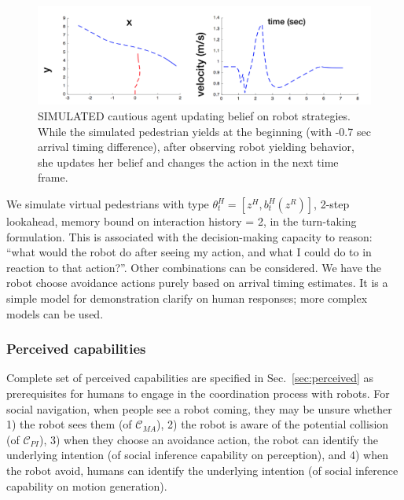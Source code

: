 \documentclass[letterpaper, 10 pt, conference]{ieeeconf}  %
\begin{document}
   \begin{figure}[t]
      \centering
      \hspace{-5em}
      \vspace{-1.3em}
      \includegraphics[scale=0.33]{adaptation}
      \hspace{-5em}
      \caption{SIMULATED cautious agent updating belief on robot strategies. While the simulated pedestrian yields at the 
      beginning (with -0.7 sec arrival timing difference), after observing 
      robot yielding behavior, she updates her 
      belief and changes the action in the next time frame.}
      \vspace{-2em}
     \label{fig:adaptation}
   \end{figure}
We simulate virtual pedestrians with type $\theta^H_t = [z^H, b^H_t(z^R)]$, 2-step 
lookahead, memory bound on interaction history = 2,  
in the turn-taking formulation. This is associated with the decision-making 
capacity to reason: ``what would the robot do after seeing my action, and what 
I could do to in reaction to that action?''. Other combinations can be 
considered. 
We have the robot 
choose avoidance actions purely based on arrival timing estimates. It is a  simple model for demonstration clarify on human 
responses; more complex models can be used.

\subsubsection{Perceived capabilities}
Complete set of perceived capabilities are specified in Sec.~\ref{sec:perceived} as 
prerequisites for humans to engage in the coordination process with robots. 
For social navigation, when people see a robot coming, they may be unsure 
whether 1) the robot sees them (of $\mathcal{C}_{MA}$), 2) the robot is aware of the potential 
collision (of $\mathcal{C}_{PI}$), 3) when they choose an avoidance action, the robot can identify the underlying 
intention (of social inference capability on perception), and 4) when the robot 
avoid, humans can identify the underlying intention (of social inference 
capability on motion generation). 
\end{document}
